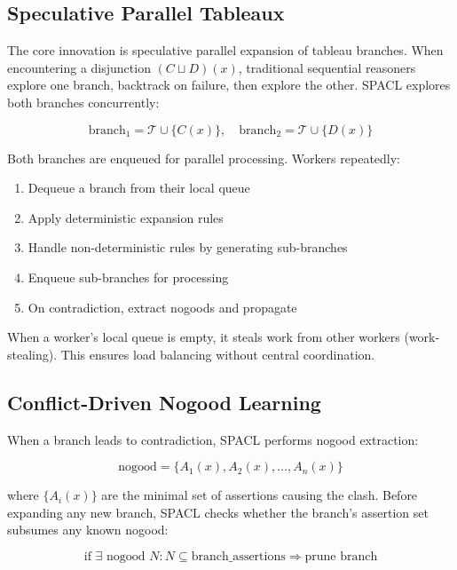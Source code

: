 \documentclass[preprint,12pt]{elsarticle}
\begin{document}
\subsection{Speculative Parallel Tableaux}
\label{sec:speculative}

The core innovation is speculative parallel expansion of tableau branches. When encountering a disjunction $(C \sqcup D)(x)$, traditional sequential reasoners explore one branch, backtrack on failure, then explore the other. SPACL explores both branches concurrently:

\begin{equation}
\text{branch}_1 = \mathcal{T} \cup \{C(x)\}, \quad \text{branch}_2 = \mathcal{T} \cup \{D(x)\}
\end{equation}

Both branches are enqueued for parallel processing. Workers repeatedly:
\begin{enumerate}
    \item Dequeue a branch from their local queue
    \item Apply deterministic expansion rules
    \item Handle non-deterministic rules by generating sub-branches
    \item Enqueue sub-branches for processing
    \item On contradiction, extract nogoods and propagate
\end{enumerate}

When a worker's local queue is empty, it steals work from other workers (work-stealing). This ensures load balancing without central coordination.

\subsection{Conflict-Driven Nogood Learning}
\label{sec:nogood}

When a branch leads to contradiction, SPACL performs nogood extraction:

\begin{equation}
\text{nogood} = \{A_1(x), A_2(x), \ldots, A_n(x)\}
\end{equation}

where $\{A_i(x)\}$ are the minimal set of assertions causing the clash. Before expanding any new branch, SPACL checks whether the branch's assertion set subsumes any known nogood:

\begin{equation}
\text{if } \exists \text{ nogood } N: N \subseteq \text{branch\_assertions} \Rightarrow \text{prune branch}
\end{equation}
\end{document}
